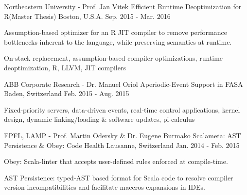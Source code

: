 \begin{cventries}
\cventry
{Northeastern University - Prof. Jan Vitek} %
{Efficient Runtime Deoptimization for R(Master Thesis)} %
{Boston, U.S.A.} %
{Sep. 2015 - Mar. 2016} %
{ %
\begin{cvitems}
\item{Assumption-based optimizer for an R JIT compiler to remove performance bottlenecks inherent to the language, while preserving semantics at runtime.}
\item {On-stack replacement, assumption-based compiler optimizations, runtime deoptimization, R, LLVM, JIT compilers}
\end{cvitems}
}

\cventry
{ABB Corporate Research - Dr. Manuel Oriol}
{Aperiodic-Event Support in FASA}
{Baden, Switzerland}
{Feb. 2015 - Aug. 2015}
{
	\begin{cvitems}
	\item{Fixed-priority servers, data-driven events, real-time control applications, kernel design, dynamic linking/loading \& software updates, pi-calculus}
	\end{cvitems}
}

\cventry
{EPFL, LAMP - Prof. Martin Odersky \& Dr. Eugene Burmako}
{Scalameta: AST Persistence \& Obey: Code Health}
{Lausanne, Switzerland}
{Jan. 2014 - Feb. 2015}
{
	\begin{cvitems}
	\item{Obey: Scala-linter that accepts user-defined rules enforced at compile-time.}
	\item{AST Persistence: typed-AST based format for Scala code to resolve
    compiler version incompatibilities and facilitate maccros expansions in
    IDEs.}
	\end{cvitems}
}

\end{cventries}
